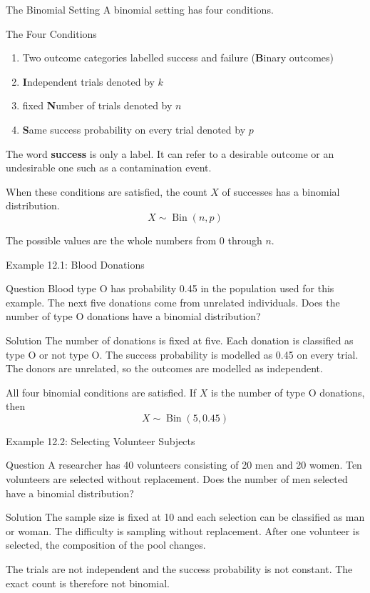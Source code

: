 \documentclass[aspectratio=169]{beamer}
\begin{document}
\begin{frame}{The Binomial Setting}
A binomial setting has four conditions.
\begin{block}{The Four Conditions}
\begin{enumerate}
	\item Two outcome categories labelled success and failure (\textbf{B}inary outcomes)
	\item \textbf{I}ndependent trials denoted by $k$
	\item fixed \textbf{N}umber of trials denoted by $n$
  	\item \textbf{S}ame success probability on every trial denoted by $p$
\end{enumerate}
\end{block}

The word \textbf{success} is only a label. It can refer to a desirable outcome or an undesirable one such as a contamination event.

When these conditions are satisfied, the count $X$ of successes has a binomial distribution.
$$X \sim \operatorname{Bin}(n,p)$$

The possible values are the whole numbers from 0 through $n$.
\end{frame}

\begin{frame}{Example 12.1: Blood Donations}
\begin{block}{Question}
Blood type O has probability 0.45 in the population used for this example. The next five donations come from unrelated individuals. Does the number of type O donations have a binomial distribution?
\end{block}


\begin{block}{Solution}
The number of donations is fixed at five. Each donation is classified as type O or not type O. The success probability is modelled as 0.45 on every trial. The donors are unrelated, so the outcomes are modelled as independent.

All four binomial conditions are satisfied. If $X$ is the number of type O donations, then
$$X \sim \operatorname{Bin}(5,0.45)$$
\end{block}
\end{frame}

\begin{frame}{Example 12.2: Selecting Volunteer Subjects}
\begin{block}{Question}
A researcher has 40 volunteers consisting of 20 men and 20 women. Ten volunteers are selected without replacement. Does the number of men selected have a binomial distribution?
\end{block}

\begin{block}{Solution}
The sample size is fixed at 10 and each selection can be classified as man or woman. The difficulty is sampling without replacement. After one volunteer is selected, the composition of the pool changes.

The trials are not independent and the success probability is not constant. The exact count is therefore not binomial.
\end{block}
\end{frame}
\end{document}
